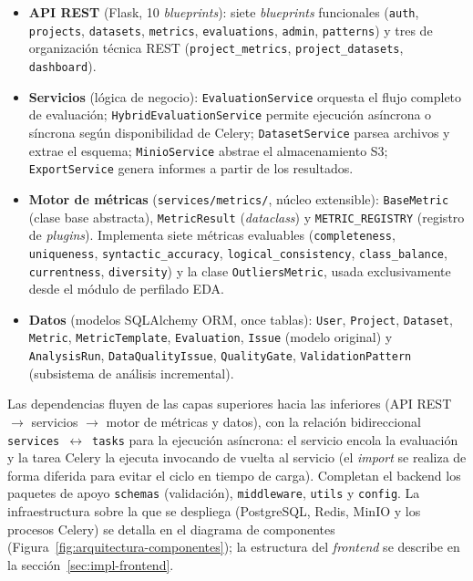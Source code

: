 \begin{itemize}
  \item \textbf{API REST} (Flask, 10 \emph{blueprints}):
    siete \emph{blueprints} funcionales (\texttt{auth}, \texttt{projects},
    \texttt{datasets}, \texttt{metrics}, \texttt{evaluations},
    \texttt{admin}, \texttt{patterns}) y tres de organización técnica
    \ac{REST} (\texttt{project\_metrics}, \texttt{project\_datasets},
    \texttt{dashboard}).

  \item \textbf{Servicios} (lógica de negocio):
    \texttt{EvaluationService} orquesta el flujo completo de evaluación;
    \texttt{HybridEvaluationService} permite ejecución asíncrona o síncrona
    según disponibilidad de Celery; \texttt{DatasetService} parsea archivos
    y extrae el esquema; \texttt{MinioService} abstrae el almacenamiento
    S3; \texttt{ExportService} genera informes a partir de los
    resultados.

  \item \textbf{Motor de métricas} (\texttt{services/metrics/}, núcleo
    extensible): \texttt{BaseMetric} (clase base abstracta),
    \texttt{MetricResult} (\emph{dataclass}) y \texttt{METRIC\_REGISTRY}
    (registro de \emph{plugins}).  Implementa siete métricas evaluables
    (\texttt{completeness}, \texttt{uniqueness}, \texttt{syntactic\_accuracy},
    \texttt{logical\_consistency}, \texttt{class\_balance},
    \texttt{currentness}, \texttt{diversity}) y la clase
    \texttt{OutliersMetric}, usada exclusivamente desde el módulo de
    perfilado \ac{EDA}.

  \item \textbf{Datos} (modelos SQLAlchemy \ac{ORM}, once tablas):
    \texttt{User}, \texttt{Project}, \texttt{Dataset}, \texttt{Metric},
    \texttt{MetricTemplate}, \texttt{Evaluation}, \texttt{Issue}
    (modelo original) y \texttt{AnalysisRun}, \texttt{DataQualityIssue},
    \texttt{QualityGate}, \texttt{ValidationPattern} (subsistema de análisis incremental).

\end{itemize}

Las dependencias fluyen de las capas superiores hacia las inferiores
(\ac{API} REST $\to$ servicios $\to$ motor de métricas y datos), con la
relación bidireccional \texttt{services}~$\leftrightarrow$~\texttt{tasks}
para la ejecución asíncrona: el servicio encola la evaluación y la tarea
Celery la ejecuta invocando de vuelta al servicio (el \emph{import} se
realiza de forma diferida para evitar el ciclo en tiempo de carga).
Completan el backend los paquetes de apoyo \texttt{schemas}
(validación), \texttt{middleware}, \texttt{utils} y \texttt{config}.  La
infraestructura sobre la que se despliega (PostgreSQL, Redis, MinIO y los
procesos Celery) se detalla en el diagrama de componentes
(Figura~\ref{fig:arquitectura-componentes}); la estructura del \emph{frontend}
se describe en la sección~\ref{sec:impl-frontend}.

